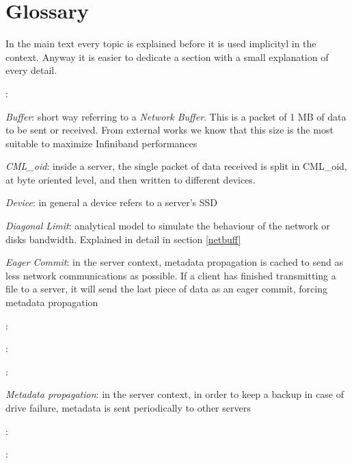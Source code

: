 \section{Glossary}
In the main text every topic is explained before it is used implicityl in the
context. Anyway it is easier to dedicate a section with a small explanation of
every detail.

\textit{}:
\vspace{10pt}

\textit{Buffer}: short way referring to a \textit{Network Buffer}. This is a
packet of 1 MB of data to be sent or received. From external works we know that
this size is the most suitable to maximize Infiniband performances\vspace{10pt}

\textit{CML\_oid}: inside a server, the single packet of data received is split
in CML\_oid, at byte oriented level, and then written to different devices.
\vspace{10pt}

\textit{Device}: in general a device refers to a server's SSD
\vspace{10pt}

\textit{Diagonal Limit}: analytical model to simulate the behaviour of the
network or disks bandwidth. Explained in detail in section \ref{netbuff}
\vspace{10pt}

\textit{Eager Commit}: in the server context, metadata propagation is cached to
send as less network communications as possible. If a client has finished
transmitting a file to a server, it will send the last piece of data as an eager
commit, forcing metadata propagation
\vspace{10pt}

\textit{}:
\vspace{10pt}

\textit{}:
\vspace{10pt}

\textit{}:
\vspace{10pt}

\textit{Metadata propagation}: in the server context, in order to keep a backup
in case of drive failure, metadata is sent periodically to other servers
\vspace{10pt}

\textit{}:
\vspace{10pt}

\textit{}:
\vspace{10pt}


